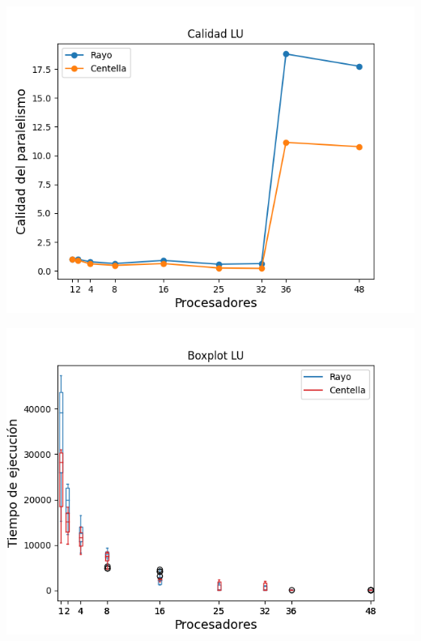 \begin{center}
 \centering
 \begin{minipage}[b]{.49\textwidth}
  \includegraphics[width=1\linewidth]{plots/calidad-LU.png}
 \end{minipage}
 \begin{minipage}[b]{.49\textwidth}
  \includegraphics[width=1\linewidth]{plots/boxplot-lu.png}
 \end{minipage}
\end{center}
